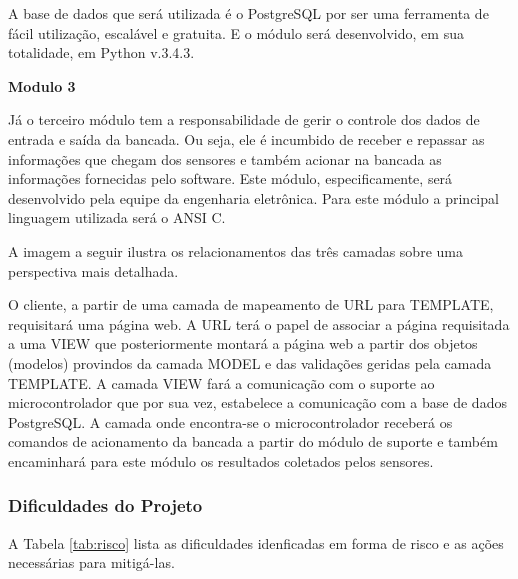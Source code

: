 	A base de dados que será utilizada é o PostgreSQL por ser uma ferramenta de fácil utilização, escalável e gratuita. E o módulo será desenvolvido, em sua totalidade, em Python v.3.4.3.


	\textbf{Modulo 3}

	Já o terceiro módulo tem a responsabilidade de gerir o controle dos dados de entrada e saída da bancada. Ou seja, ele é incumbido de receber e repassar as informações que chegam dos sensores e também acionar na bancada as informações fornecidas pelo software. Este módulo, especificamente, será desenvolvido pela equipe da engenharia eletrônica. Para este módulo a principal linguagem utilizada será o ANSI C.


	A imagem a seguir ilustra os relacionamentos das três camadas sobre uma perspectiva mais detalhada.


	O cliente, a partir de uma camada de mapeamento de URL para TEMPLATE, requisitará uma página web. A URL terá o papel de associar a página requisitada a uma VIEW que posteriormente montará a página web a partir dos objetos (modelos) provindos da camada MODEL e das validações geridas pela camada TEMPLATE. A camada VIEW fará a comunicação com o suporte ao microcontrolador que por sua vez, estabelece a comunicação com a base de dados PostgreSQL. A camada onde encontra-se o microcontrolador receberá os comandos de acionamento da bancada a partir do módulo de suporte e também encaminhará para este módulo os resultados coletados pelos sensores.

\subsubsection{Dificuldades do Projeto}

	A Tabela \ref{tab:risco} lista as dificuldades idenficadas em forma de risco e as ações necessárias para mitigá-las.

